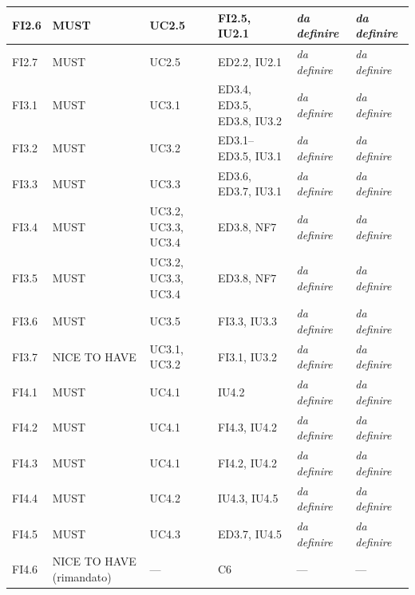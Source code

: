 {\begin{longtable}{|P{1.3cm}|P{2.0cm}|P{1.8cm}|P{2.4cm}|P{1.6cm}|P{1.5cm}|}
FI2.6 & MUST & UC2.5 & FI2.5, IU2.1 & \textit{da definire} & \textit{da definire} \\ \hline
FI2.7 & MUST & UC2.5 & ED2.2, IU2.1 & \textit{da definire} & \textit{da definire} \\ \hline
FI3.1 & MUST & UC3.1 & ED3.4, ED3.5, ED3.8, IU3.2 & \textit{da definire} & \textit{da definire} \\ \hline
FI3.2 & MUST & UC3.2 & ED3.1–ED3.5, IU3.1 & \textit{da definire} & \textit{da definire} \\ \hline
FI3.3 & MUST & UC3.3 & ED3.6, ED3.7, IU3.1 & \textit{da definire} & \textit{da definire} \\ \hline
FI3.4 & MUST & UC3.2, UC3.3, UC3.4 & ED3.8, NF7 & \textit{da definire} & \textit{da definire} \\ \hline
FI3.5 & MUST & UC3.2, UC3.3, UC3.4 & ED3.8, NF7 & \textit{da definire} & \textit{da definire} \\ \hline
FI3.6 & MUST & UC3.5 & FI3.3, IU3.3 & \textit{da definire} & \textit{da definire} \\ \hline
FI3.7 & NICE TO HAVE & UC3.1, UC3.2 & FI3.1, IU3.2 & \textit{da definire} & \textit{da definire} \\ \hline
FI4.1 & MUST & UC4.1 & IU4.2 & \textit{da definire} & \textit{da definire} \\ \hline
FI4.2 & MUST & UC4.1 & FI4.3, IU4.2 & \textit{da definire} & \textit{da definire} \\ \hline
FI4.3 & MUST & UC4.1 & FI4.2, IU4.2 & \textit{da definire} & \textit{da definire} \\ \hline
FI4.4 & MUST & UC4.2 & IU4.3, IU4.5 & \textit{da definire} & \textit{da definire} \\ \hline
FI4.5 & MUST & UC4.3 & ED3.7, IU4.5 & \textit{da definire} & \textit{da definire} \\ \hline
FI4.6 & NICE TO HAVE (rimandato) & — & C6 & — & — \\ \hline
\end{longtable}
}
